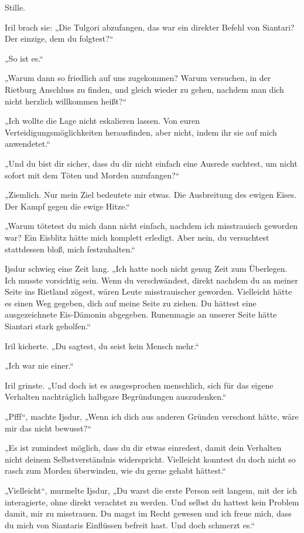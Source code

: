 Stille.

Iril brach sie: „Die Tulgori abzufangen, das war ein direkter Befehl von Siantari? Der einzige, dem du folgtest?“

„So ist es.“

„Warum dann so friedlich auf uns zugekommen? Warum versuchen, in der Rietburg Anschluss zu finden, und gleich wieder zu gehen, nachdem man dich nicht herzlich willkommen heißt?“

„Ich wollte die Lage nicht eskalieren lassen. Von euren Verteidigungsmöglichkeiten herausfinden, aber nicht, indem ihr sie auf mich anwendetet.“

„Und du bist dir sicher, dass du dir nicht einfach eine Ausrede suchtest, um nicht sofort mit dem Töten und Morden anzufangen?“

„Ziemlich. Nur mein Ziel bedeutete mir etwas. Die Ausbreitung des ewigen Eises. Der Kampf gegen die ewige Hitze.“

„Warum tötetest du mich dann nicht einfach, nachdem ich misstrauisch geworden war? Ein Eisblitz hätte mich komplett erledigt. Aber nein, du versuchtest stattdessen bloß, mich festzuhalten.“

Ijsdur schwieg eine Zeit lang. „Ich hatte noch nicht genug Zeit zum Überlegen. Ich musste vorsichtig sein. Wenn du verschwändest, direkt nachdem du an meiner Seite ins Rietland zögest, wären Leute misstrauischer geworden. Vielleicht hätte es einen Weg gegeben, dich auf meine Seite zu ziehen. Du hättest eine ausgezeichnete Eis-Dämonin abgegeben. Runenmagie an unserer Seite hätte Siantari stark geholfen.“

Iril kicherte. „Du sagtest, du seist kein Mensch mehr.“

„Ich war nie einer.“

Iril grinste. „Und doch ist es ausgesprochen menschlich, sich für das eigene Verhalten nachträglich halbgare Begründungen auszudenken.“

„Pfff“, machte Ijsdur, „Wenn ich dich aus anderen Gründen verschont hätte, wäre mir das nicht bewusst?“

„Es ist zumindest möglich, dass du dir etwas einredest, damit dein Verhalten nicht deinem Selbstverständnis widerspricht. Vielleicht konntest du doch nicht so rasch zum Morden überwinden, wie du gerne gehabt hättest.“

„Vielleicht“, murmelte Ijsdur, „Du warst die erste Person seit langem, mit der ich interagierte, ohne direkt verachtet zu werden. Und selbst du hattest kein Problem damit, mir zu misstrauen. Du magst im Recht gewesen und ich freue mich, dass du mich von Siantaris Einflüssen befreit hast. Und doch schmerzt es.“


